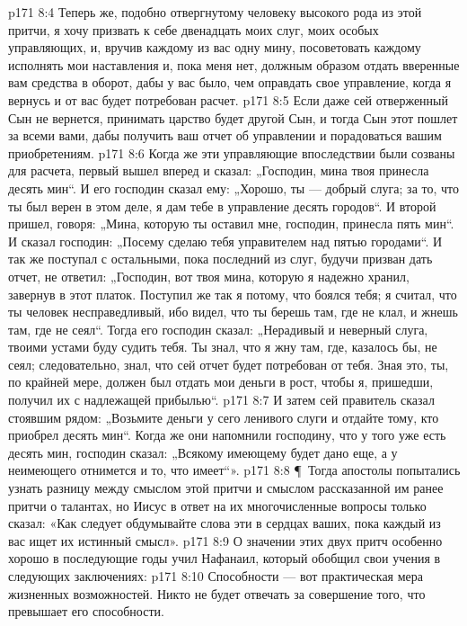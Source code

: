 \vs p171 8:4 Теперь же, подобно отвергнутому человеку высокого рода из этой притчи, я хочу призвать к себе двенадцать моих слуг, моих особых управляющих, и, вручив каждому из вас одну мину, посоветовать каждому исполнять мои наставления и, пока меня нет, должным образом отдать вверенные вам средства в оборот, дабы у вас было, чем оправдать свое управление, когда я вернусь и от вас будет потребован расчет.
\vs p171 8:5 Если даже сей отверженный Сын не вернется, принимать царство будет другой Сын, и тогда Сын этот пошлет за всеми вами, дабы получить ваш отчет об управлении и порадоваться вашим приобретениям.
\vs p171 8:6 Когда же эти управляющие впоследствии были созваны для расчета, первый вышел вперед и сказал: „Господин, мина твоя принесла десять мин“. И его господин сказал ему: „Хорошо, ты --- добрый слуга; за то, что ты был верен в этом деле, я дам тебе в управление десять городов“. И второй пришел, говоря: „Мина, которую ты оставил мне, господин, принесла пять мин“. И сказал господин: „Посему сделаю тебя управителем над пятью городами“. И так же поступал с остальными, пока последний из слуг, будучи призван дать отчет, не ответил: „Господин, вот твоя мина, которую я надежно хранил, завернув в этот платок. Поступил же так я потому, что боялся тебя; я считал, что ты человек несправедливый, ибо видел, что ты берешь там, где не клал, и жнешь там, где не сеял“. Тогда его господин сказал: „Нерадивый и неверный слуга, твоими устами буду судить тебя. Ты знал, что я жну там, где, казалось бы, не сеял; следовательно, знал, что сей отчет будет потребован от тебя. Зная это, ты, по крайней мере, должен был отдать мои деньги в рост, чтобы я, пришедши, получил их с надлежащей прибылью“.
\vs p171 8:7 И затем сей правитель сказал стоявшим рядом: „Возьмите деньги у сего ленивого слуги и отдайте тому, кто приобрел десять мин“. Когда же они напомнили господину, что у того уже есть десять мин, господин сказал: „Всякому имеющему будет дано еще, а у неимеющего отнимется и то, что имеет“».
\vs p171 8:8 \P\ Тогда апостолы попытались узнать разницу между смыслом этой притчи и смыслом рассказанной им ранее притчи о талантах, но Иисус в ответ на их многочисленные вопросы только сказал: «Как следует обдумывайте слова эти в сердцах ваших, пока каждый из вас ищет их истинный смысл».
\vs p171 8:9 О значении этих двух притч особенно хорошо в последующие годы учил Нафанаил, который обобщил свои учения в следующих заключениях:
\vs p171 8:10 \bibnobreakspace Способности --- вот практическая мера жизненных возможностей. Никто не будет отвечать за совершение того, что превышает его способности.
